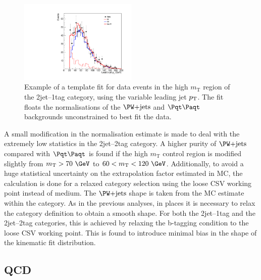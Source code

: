 \begin{figure}
\begin{center}
    \includegraphics[width=0.5\textwidth]
      {plots/Hhh/W_TT_fit_prebjetpt_1_2jet1tag.pdf}

\end{center}
\caption[Example of a template fit for data events in the high $m_{\text{T}}$ region of the
2jet--1tag category, using the variable leading jet $\pt$.]{
Example of a template fit for data events in the high $m_{\text{T}}$ region of the
2jet--1tag category, using the variable leading jet $\pt$. The fit floats the
normalisations of the $\WJets$ and $\ttbar$ backgrounds unconstrained to best
fit the data.}
\label{fig:highmtfit}
\end{figure}

A small modification in the normalisation estimate is made to deal with the
extremely low statistics in the 2jet--2tag category. A higher purity of $\WJets$
compared with $\ttbar$ is found if the high $m_{\text{T}}$ control region is modified
slightly from $m_{\text{T}}>70~\GeV$ to $60<m_{\text{T}}<120~\GeV$.
Additionally, to avoid a huge statistical uncertainty on the extrapolation
factor estimated in \ac{MC}, the calculation is done for a relaxed category
selection using the loose \ac{CSV} working point instead of medium. 
The $\WJets$ shape is taken from the \ac{MC} estimate within the category. As
in the previous analyses, in places it is necessary to relax the category
definition to obtain a smooth shape. For both the 2jet--1tag and the 2jet--2tag
categories, this is achieved by relaxing the b-tagging condition to the
loose \ac{CSV} working point. This is found to introduce minimal bias in the
shape of the kinematic fit distribution. 

\subsection{QCD}

